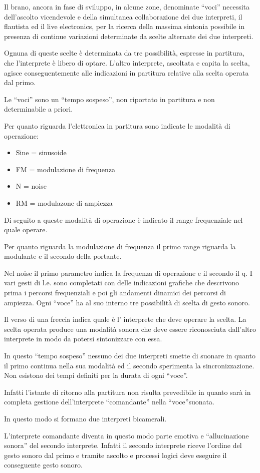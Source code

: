Il brano, ancora in fase di sviluppo, in alcune zone, denominate “voci” necessita dell’ascolto vicendevole e della simultanea collaborazione  dei due interpreti, il flautista ed il live electronics, per la ricerca della massima sintonia possibile in presenza di continue variazioni determinate da scelte alternate dei due interpreti.

Ognuna di queste scelte è determinata da tre possibilità, espresse in partitura,  che l’interprete è libero di optare. L’altro interprete, ascoltata e capita la scelta, agisce conseguentemente alle indicazioni in partitura relative alla scelta operata dal primo.

Le “voci” sono un “tempo sospeso”, non riportato in partitura e non determinabile a priori.

Per quanto riguarda l’elettronica  in partitura sono indicate le modalità di
operazione:

\begin{itemize}
  \item Sine = sinusoide
  \item FM = modulazione di frequenza
  \item N = noise
  \item RM  = modulazone di ampiezza
\end{itemize}

Di seguito a queste modalità di operazione è indicato il range frequenziale nel quale operare.

Per quanto riguarda la modulazione di frequenza il primo range riguarda la modulante e il secondo della portante.

Nel noise il primo parametro indica la frequenza di operazione e il secondo il q.
I vari gesti di l.e. sono completati con delle indicazioni grafiche che descrivono prima i percorsi frequenziali e poi gli andamenti dinamici dei percorsi di ampiezza.
Ogni “voce” ha al suo interno tre possibilità di scelta di gesto sonoro.

Il verso di una freccia indica quale è l’ interprete  che deve operare la scelta.
La scelta operata produce una modalità sonora che deve essere riconosciuta dall’altro interprete in modo da potersi sintonizzare con essa.

In questo “tempo sospeso” nessuno dei due interpreti smette di suonare  in quanto il primo continua nella sua modalità ed il secondo sperimenta la sincronizzazione.
Non esistono  dei tempi definiti per la  durata di ogni “voce”.

Infatti l’istante di ritorno alla partitura non risulta prevedibile  in quanto  sarà in completa gestione dell’interprete “comandante” nella “voce”suonata.

In questo modo si formano due interpreti bicamerali.

L’interprete comandante diventa in questo modo parte emotiva e “allucinazione sonora” del secondo interprete. Infatti il secondo interprete riceve l’ordine del gesto sonoro dal primo e tramite ascolto e processi logici deve eseguire  il conseguente gesto sonoro.
